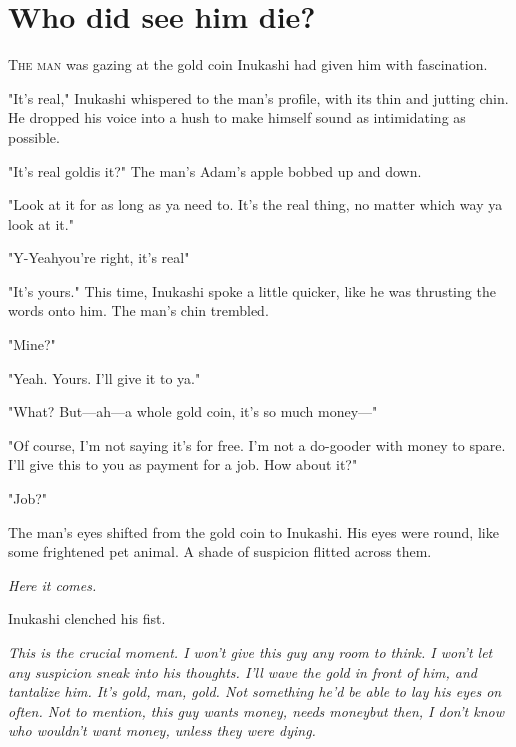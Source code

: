 
\chapter{Who did see him die?}


\lettrine{T}{he man} was gazing at the gold coin Inukashi had given him with
fascination.

"It's real," Inukashi whispered to the man's profile, with its thin and
jutting chin. He dropped his voice into a hush to make himself sound as
intimidating as possible.

"It's real gold\el is it?" The man's Adam's apple bobbed up and down.

"Look at it for as long as ya need to. It's the real thing, no matter
which way ya look at it."

"Y-Yeah\el you're right, it's real\el "

"It's yours." This time, Inukashi spoke a little quicker, like he was
thrusting the words onto him. The man's chin trembled.

"Mine?"

"Yeah. Yours. I'll give it to ya."

"What? But---ah---a whole gold coin, it's so much money---"

"Of course, I'm not saying it's for free. I'm not a do-gooder with money
to spare. I'll give this to you as payment for a job. How about it?"

"Job?"

The man's eyes shifted from the gold coin to Inukashi. His eyes were
round, like some frightened pet animal. A shade of suspicion flitted
across them.

\emph{Here it comes.}

Inukashi clenched his fist.

\emph{This is the crucial moment. I won't give this guy any room to think. I
won't let any suspicion sneak into his thoughts. I'll wave the gold in
front of him, and tantalize him. It's gold, man, gold. Not something
he'd be able to lay his eyes on often. Not to mention, this guy wants
money, \emph{needs} money\el but then, I don't know who \emph{wouldn't} want money,
unless they were dying.}

